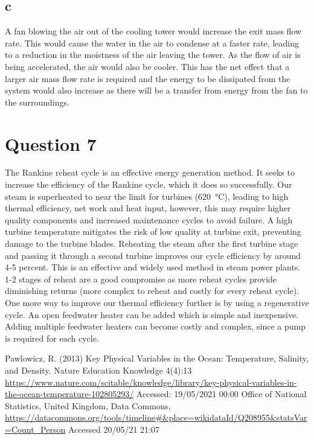 \documentclass[11pt]{article}
\numberwithin{equation}{section}
\begin{document}
\subsection{c}
A fan blowing the air out of the cooling tower would increase the exit mass flow rate. This would cause the water in the air to condense at a faster rate, leading to a reduction in the moistness of the air leaving the tower. As the flow of air is being accelerated, the air would also be cooler. This has the net effect that a larger air mass flow rate is required and the energy to be dissipated from the system would also increase as there will be a transfer from energy from the fan to the surroundings. 
\section{Question 7}
The Rankine reheat cycle is an effective energy generation method. It seeks to increase the efficiency of the Rankine cycle, which it does so successfully. Our steam is superheated to near the limit for turbines (\SI{620}{\celsius}), leading to high thermal efficiency, net work and heat input, however, this may require higher quality components and increased maintenance cycles to avoid failure. A high turbine temperature mitigates the risk of low quality at turbine exit, preventing damage to the turbine blades. Reheating the steam after the first turbine stage and passing it through a second turbine improves our cycle efficiency by around 4-5 percent. This is an effective and widely used method in steam power plants. 1-2 stages of reheat are a good compromise as more reheat cycles provide diminishing returns (more complex to reheat and costly for every reheat cycle). One more way to improve our thermal efficiency further is by using a regenerative cycle. An open feedwater heater can be added which is simple and inexpensive. Adding multiple feedwater heaters can become costly and complex, since a pump is required for each cycle. 
\begin{thebibliography}{00}
     Pawlowicz, R. (2013) Key Physical Variables in the Ocean: Temperature, Salinity, and Density. Nature Education Knowledge 4(4):13 \url{https://www.nature.com/scitable/knowledge/library/key-physical-variables-in-the-ocean-temperature-102805293/} Accessed: 19/05/2021 00:00
     Office of National Statistics, United Kingdom, Data Commons, \url{https://datacommons.org/tools/timeline#&place=wikidataId/Q208955&statsVar=Count_Person} Accessed 20/05/21 21:07
\end{thebibliography}
\end{document}
